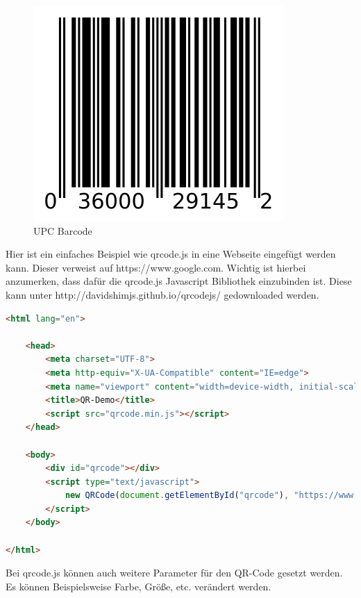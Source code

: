 \begin{figure}[H]
    \centering
    \includegraphics[scale=0.8]{pics/UPCBarcode.png}
    \caption{UPC Barcode}
\end{figure}


Hier ist ein einfaches Beispiel wie qrcode.js in eine Webseite eingefügt werden kann.
Dieser verweist auf https://www.google.com. Wichtig ist hierbei anzumerken, dass dafür die qrcode.js Javascript Bibliothek einzubinden ist.
Diese kann unter http://davidshimjs.github.io/qrcodejs/ gedownloaded werden.
\begin{lstlisting}[language=html,caption=QR-Code Demo,label=lst:tech:gaussianBlur]
<html lang="en">

    <head>
        <meta charset="UTF-8">
        <meta http-equiv="X-UA-Compatible" content="IE=edge">
        <meta name="viewport" content="width=device-width, initial-scale=1.0">
        <title>QR-Demo</title>
        <script src="qrcode.min.js"></script>
    </head>
    
    <body>
        <div id="qrcode"></div>
        <script type="text/javascript">
            new QRCode(document.getElementById("qrcode"), "https://www.google.com");
        </script>
    </body>
    
</html>
\end{lstlisting}

Bei qrcode.js können auch weitere Parameter für den QR-Code gesetzt werden. Es können
Beispielsweise Farbe, Größe, etc. verändert werden.

